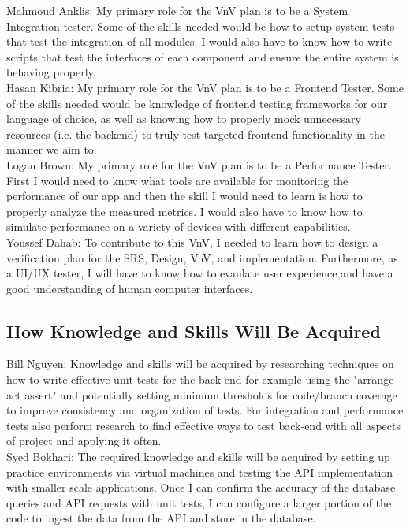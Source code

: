 \documentclass[12pt, titlepage]{article}
\begin{document}
\noindent Mahmoud Anklis: My primary role for the VnV plan is to be a System Integration tester. Some of the skills needed would be how to setup system tests that test the integration of all modules. I would also have to know how to write scripts that test the interfaces of each component and ensure the entire system is behaving properly.\\

\noindent Hasan Kibria: My primary role for the VnV plan is to be a Frontend Tester. Some of the skills needed would be knowledge of frontend testing frameworks for our language of choice, as well as knowing how to properly mock unnecessary resources (i.e. the backend) to truly test targeted frontend functionality in the manner we aim to.\\

\noindent Logan Brown: My primary role for the VnV plan is to be a Performance Tester. First I would need to know what tools are available for monitoring the performance of our app and then the skill I would need to learn is how to properly analyze the measured metrics. I would also have to know how to simulate performance on a variety of devices with different capabilities.\\

\noindent Youssef Dahab: To contribute to this VnV, I needed to learn how to design a verification plan for the SRS, Design, VnV, and implementation. Furthermore, as a UI/UX tester, I will have to know how to evaulate user experience and have a good understanding of human computer interfaces.\\

\subsection{How Knowledge and Skills Will Be Acquired}

\noindent Bill Nguyen: Knowledge and skills will be acquired by researching techniques on how to write effective unit tests for the back-end for example using the "arrange act assert" and potentially setting minimum thresholds for code/branch coverage to improve consistency and organization of tests. For integration and performance tests also perform research to find effective ways to test back-end with all aspects of project and applying it often.\\

\noindent Syed Bokhari: The required knowledge and skills will be acquired by setting up practice environments via virtual machines and testing the API implementation with smaller scale applications. Once I can confirm the accuracy of the database queries and API requests with unit tests, I can configure a larger portion of the code to ingest the data from the API and store in the database.\\
\end{document}
